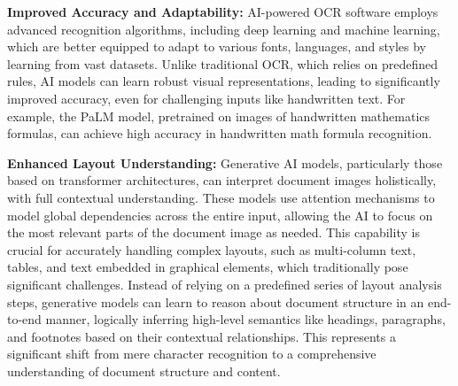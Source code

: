 \textbf{Improved Accuracy and Adaptability:} AI-powered OCR software employs advanced recognition algorithms, including deep learning and machine learning, which are better equipped to adapt to various fonts, languages, and styles by learning from vast datasets. Unlike traditional OCR, which relies on predefined rules, AI models can learn robust visual representations, leading to significantly improved accuracy, even for challenging inputs like handwritten text. For example, the PaLM model, pretrained on images of handwritten mathematics formulas, can achieve high accuracy in handwritten math formula recognition.

\textbf{Enhanced Layout Understanding:} Generative AI models, particularly those based on transformer architectures, can interpret document images holistically, with full contextual understanding. These models use attention mechanisms to model global dependencies across the entire input, allowing the AI to focus on the most relevant parts of the document image as needed. This capability is crucial for accurately handling complex layouts, such as multi-column text, tables, and text embedded in graphical elements, which traditionally pose significant challenges. Instead of relying on a predefined series of layout analysis steps, generative models can learn to reason about document structure in an end-to-end manner, logically inferring high-level semantics like headings, paragraphs, and footnotes based on their contextual relationships. This represents a significant shift from mere character recognition to a comprehensive understanding of document structure and content.

